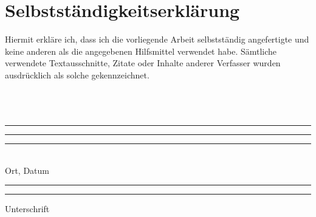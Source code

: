 \section*{Selbstständigkeitserklärung}

Hiermit erkläre ich, dass ich die vorliegende Arbeit selbstständig angefertigte und keine anderen als die angegebenen Hilfsmittel verwendet habe. Sämtliche verwendete Textausschnitte, Zitate oder Inhalte anderer Verfasser wurden ausdrücklich als solche gekennzeichnet.\\
\\
\\
\\
\noindent\rule{7cm}{0.4pt}   \rule{1cm}{0pt}  \rule{7cm}{0.4pt}\\
\noindent
Ort, Datum\rule{5.1cm}{0pt} \rule{1cm}{0pt}  Unterschrift

\clearpage